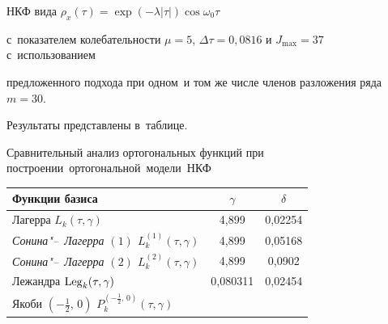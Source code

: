 НКФ вида $\rho _x  ( \tau  )=\exp(-\lambda  | \tau  |)\cos \omega _0 \tau $

с~показателем колебательности \mbox{$\mu =5$}, $\Delta \tau =0,0816$ и $J_{\max } =37$  с~использованием

предложенного подхода при одном~и том же числе членов разложения ряда $m=30$.

Результаты представлены в~таблице.







\begin{table}[h!]

\centering \footnotesize

{\bf

Сравнительный анализ ортогональных функций при построении~ортогональной~модели~НКФ }\vspace{1mm}



\begin{tabular}{l|c|c}

\hline

Функции базиса&

$\gamma $&

$\delta$ \\

\hline

Лагерра $L_k(\tau, \gamma)$&

{4,899}&

{0,02254} \\


\it Сонина"--~Лагерра $(1)$ $L_k^{(1)}(\tau, \gamma)$&

4,899&

0,05168 \\


\it Сонина"--~Лагерра $(2)$ $L_k^{(2)}(\tau, \gamma)$&

4,899&

0,0902 \\


Лежандра ${\rm Leg}_k (\tau, \gamma)$&

0,080311&

0,02454 \\


Якоби $(-\frac12,\, 0)$ $P_k^{(-\frac12,\, 0)} (\tau, \gamma)$&


\end{tabular}
\end{table}
